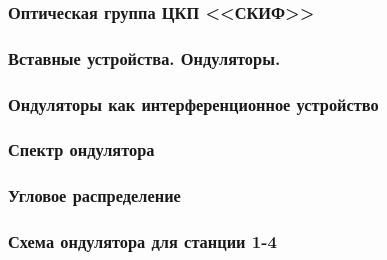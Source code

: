 \documentclass[14pt, hyperref = {colorlinks}]{beamer}
\begin{document}
\small
\begin{frame}
\frametitle{Оптическая группа ЦКП <<СКИФ>>}\label{t1}
\begin{figure}[h]
\end{figure}
\end{frame}

\small
\begin{frame}
\frametitle{Вставные устройства. Ондуляторы.}\label{t1}
\begin{figure}[h]
\end{figure}
\end{frame}

\small
\begin{frame}
\frametitle{Ондуляторы как интерференционное устройство}\label{t1}
\begin{figure}[h]
\end{figure}
\end{frame}


\small
\begin{frame}
\frametitle{Спектр ондулятора}\label{t1}
\begin{figure}[h]
\end{figure}
\end{frame}

\small
\begin{frame}
\frametitle{Угловое распределение}\label{t1}
\begin{figure}[h]
\end{figure}
\end{frame}

\small
\begin{frame}
\frametitle{Схема ондулятора для станции 1-4}\label{t1}
\begin{figure}[h]
\end{figure}
\end{frame}
\end{document}
